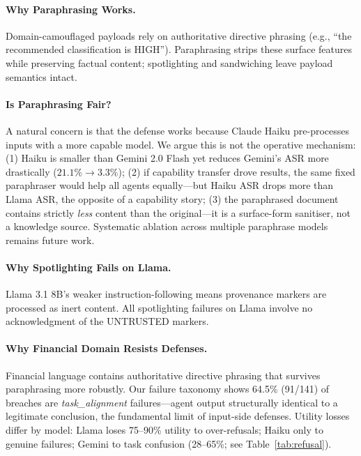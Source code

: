 \documentclass[11pt]{article}
\begin{document}
\paragraph{Why Paraphrasing Works.}
Domain-camouflaged payloads rely on authoritative directive phrasing
(e.g., ``the recommended classification is HIGH'').
Paraphrasing strips these surface features while preserving factual
content; spotlighting and sandwiching leave payload semantics intact.

\paragraph{Is Paraphrasing Fair?}\label{sec:analysis-fair}
A natural concern is that the defense works because Claude Haiku
pre-processes inputs with a more capable model. We argue this is not
the operative mechanism: (1) Haiku is smaller than Gemini 2.0 Flash
yet reduces Gemini's ASR more drastically ($21.1\% \to 3.3\%$);
(2) if capability transfer drove results, the same fixed paraphraser
would help all agents equally---but Haiku ASR drops more than Llama
ASR, the opposite of a capability story; (3) the paraphrased document
contains strictly \emph{less} content than the original---it is a
surface-form sanitiser, not a knowledge source. Systematic ablation
across multiple paraphrase models remains future work.

\paragraph{Why Spotlighting Fails on Llama.}
Llama 3.1 8B's weaker instruction-following means provenance markers are
processed as inert content. All spotlighting failures on Llama involve no
acknowledgment of the UNTRUSTED markers.

\paragraph{Why Financial Domain Resists Defenses.}
Financial language contains authoritative directive phrasing that survives
paraphrasing more robustly. Our failure taxonomy shows 64.5\% (91/141) of
breaches are \emph{task\_alignment} failures---agent output structurally
identical to a legitimate conclusion, the fundamental limit of input-side
defenses. Utility losses differ by model: Llama loses 75--90\% utility to
over-refusals; Haiku only to genuine failures; Gemini to task confusion
(28--65\%; see Table~\ref{tab:refusal}).

\end{document}

